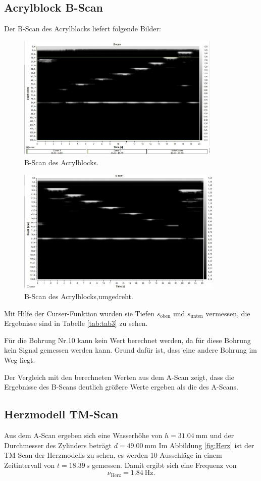 \subsection{Acrylblock B-Scan}
Der B-Scan des Acrylblocks liefert folgende Bilder:

\begin{figure}[H]
  \centering
  \includegraphics[height=6cm]{bscan12.jpg}
  \caption{B-Scan des Acrylblocks.}
  \label{bscan1}
\end{figure}

\begin{figure}[H]
  \centering
  \includegraphics[height=6cm]{bscan22.jpg}
  \caption{B-Scan des Acrylblocks,umgedreht.}
  \label{bscan2}
\end{figure}

Mit Hilfe der Curser-Funktion wurden sie Tiefen $s_{\text{oben}}$ und $s_{\text{unten}}$
vermessen, die Ergebnisse sind in Tabelle \ref{tab:tab3} zu sehen.

Für die Bohrung Nr.10 kann kein Wert berechnet werden, da für diese Bohrung kein
Signal gemessen werden kann. Grund dafür ist, dass eine andere Bohrung
im Weg liegt.

Der Vergleich mit den berechneten Werten aus dem A-Scan zeigt, dass
die Ergebnisse des B-Scans deutlich größere Werte ergeben als die des A-Scans.


\subsection{Herzmodell TM-Scan}
Aus dem A-Scan ergeben sich eine Wasserhöhe von $h=\SI{31,04}{\mm}$ und der
Durchmesser des Zylinders beträgt $d=\SI{49,00}{\mm}$
Im Abbildung \ref{fig:Herz} ist der TM-Scan der Herzmodells zu sehen, es werden
10 Ausschläge in einem Zeitintervall von $t=\SI{18,39}{\s}$ gemessen. Damit ergibt sich eine
Frequenz von
\begin{equation}
  \nu_{\text{Herz}}=\SI{1,84}{\Hz}.
\end{equation}

